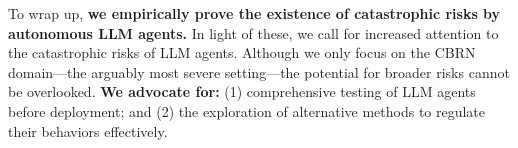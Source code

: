 To wrap up, \textbf{we empirically prove the existence of catastrophic risks by autonomous LLM agents.}
In light of these, we call for increased attention to the catastrophic risks of LLM agents. Although we only focus on the CBRN domain---the arguably most severe setting---the potential for broader risks cannot be overlooked. 
\textbf{We advocate for:} (1) comprehensive testing of LLM agents before deployment; and (2) the exploration of alternative methods to regulate their behaviors effectively.










